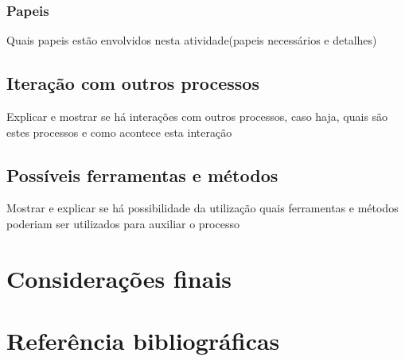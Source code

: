 \documentclass{article}
\begin{document}
		\subsubsection{Papeis}
			Quais papeis estão envolvidos nesta atividade(papeis necessários e detalhes)

	\subsection{Iteração com outros processos}		
		Explicar e mostrar se há interações com outros processos, caso haja, quais são estes processos e como acontece esta interação
	
	\subsection{Possíveis ferramentas e métodos}
		Mostrar e explicar se há possibilidade da utilização quais ferramentas e métodos poderiam ser utilizados para auxiliar o processo


	
\section{Considerações finais}

\section{Referência bibliográficas}
\end{document}
